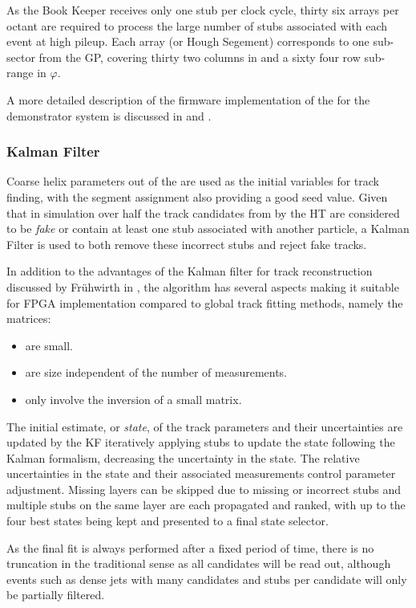 As the Book Keeper receives only one stub per clock cycle, thirty six arrays per octant are required to process the large number of stubs associated with each event at high pileup.
Each array (or Hough Segement) corresponds to one sub-sector from the GP, covering thirty two columns in \qpt and a sixty four row sub-range in $\varphi$.

A more detailed description of the firmware implementation of the \HT for the demonstrator system is discussed in \cite{IEEE} and \cite{TmttNote}.

\subsubsection{Kalman Filter}
Coarse \rphi helix parameters out of the \HT are used as the initial variables for track finding, with the segment assignment also providing a good seed value.
Given that in simulation over half the track candidates from by the HT are considered to be \textit{fake} or contain at least one stub associated with another particle, a Kalman Filter is used to both remove these incorrect stubs and reject fake tracks. 

In addition to the advantages of the Kalman filter for track reconstruction discussed by Fr{\"u}hwirth in \cite{Fruhwirth:1987fm}, the algorithm has several aspects making it suitable for FPGA implementation compared to global track fitting methods, namely the matrices:

\begin{itemize}
\item {are small.}
\item {are size independent of the number of measurements.}
\item {only involve the inversion of a small matrix.}
\end{itemize}

The initial estimate, or \textit{state}, of the track parameters and their uncertainties are updated by the KF iteratively applying stubs to update the state following the Kalman formalism, decreasing the uncertainty in the state. 
The relative uncertainties in the state and their associated measurements control parameter adjustment.
Missing layers can be skipped due to missing or incorrect stubs and multiple stubs on the same layer are each propagated and ranked, with up to the four best states being kept and presented to a final state selector.

As the final fit is always performed after a fixed period of time, there is no truncation in the traditional sense as all candidates will be read out, although events such as dense jets with many candidates and stubs per candidate will only be partially filtered.

